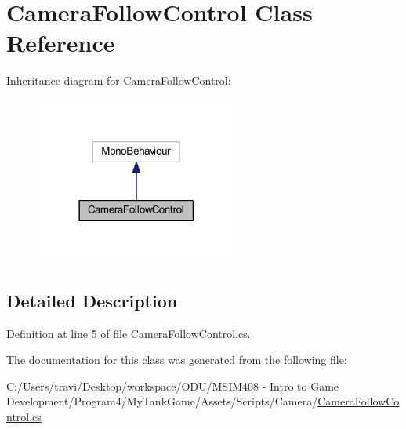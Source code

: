 \hypertarget{class_camera_follow_control}{}\section{Camera\+Follow\+Control Class Reference}
\label{class_camera_follow_control}


Inheritance diagram for Camera\+Follow\+Control\+:
\nopagebreak
\begin{figure}[H]
\begin{center}
\leavevmode
\includegraphics[width=189pt]{class_camera_follow_control__inherit__graph}
\end{center}
\end{figure}


\subsection{Detailed Description}


Definition at line 5 of file Camera\+Follow\+Control.\+cs.



The documentation for this class was generated from the following file\+:\begin{DoxyCompactItemize}
\item 
C\+:/\+Users/travi/\+Desktop/workspace/\+O\+D\+U/\+M\+S\+I\+M408 -\/ Intro to Game Development/\+Program4/\+My\+Tank\+Game/\+Assets/\+Scripts/\+Camera/\hyperlink{_camera_follow_control_8cs}{Camera\+Follow\+Control.\+cs}\end{DoxyCompactItemize}
